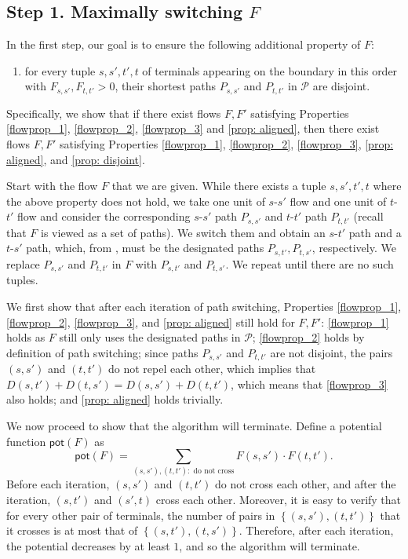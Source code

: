 \documentclass[11pt]{article}
\newcommand{\pset}{{\mathcal{P}}}
\newcommand{\pot}{{\mathsf{pot}}}
\newcommand{\set}[1]{\left\{ #1 \right\}}
\begin{document}
\subsection{Step 1. Maximally switching $F$}

In the first step, our goal is to ensure the following additional property of $F$:
\begin{enumerate}[resume]
\item for every tuple $s,s',t',t$ of terminals appearing on the boundary in this order with $F_{s,s'},F_{t,t'}>0$, their shortest paths $P_{s,s'}$ and $P_{t,t'}$ in $\pset$ are disjoint.  \label{prop: disjoint}
\end{enumerate}

Specifically, we show that if there exist flows $F,F'$ satisfying Properties \ref{flowprop_1}, \ref{flowprop_2}, \ref{flowprop_3} and \ref{prop: aligned}, then there exist flows $F,F'$ satisfying Properties \ref{flowprop_1}, \ref{flowprop_2}, \ref{flowprop_3}, \ref{prop: aligned}, and \ref{prop: disjoint}.

Start with the flow $F$ that we are given. While there exists a tuple $s,s',t',t$ where the above property does not hold, 
we take one unit of $s$-$s'$ flow and one unit of $t$-$t'$ flow and consider the corresponding $s$-$s'$ path $P_{s,s'}$ and $t$-$t'$ path $P_{t,t'}$ (recall that $F$ is viewed as a set of paths). We switch them and obtain an $s$-$t'$ path and a $t$-$s'$ path, which,
from , must be the designated paths $P_{s,t'},P_{t,s'}$, respectively. We replace $P_{s,s'}$ and $P_{t,t'}$ in $F$ with $P_{s,t'}$ and $P_{t,s'}$. We repeat until there are no such tuples.

We first show that after each iteration of path switching, Properties \ref{flowprop_1}, \ref{flowprop_2}, \ref{flowprop_3}, and \ref{prop: aligned} still hold for $F,F'$: \ref{flowprop_1} holds as $F$ still only uses the designated paths in $\pset$; \ref{flowprop_2} holds by definition of path switching; since paths $P_{s,s'}$ and $P_{t,t'}$ are not disjoint, the pairs $(s,s')$ and $(t,t')$ do not repel each other, which implies that $D(s,t')+D(t,s')=D(s,s')+D(t,t')$, which means that \ref{flowprop_3} also holds; and \ref{prop: aligned} holds trivially. 

We now proceed to show that the algorithm will terminate. Define a potential function $\pot(F)$ as
\[
\pot(F) =   \sum_{(s,s'), (t,t'): \text{ do not cross}} F(s,s') \cdot F(t,t').
\]
Before each iteration, $(s,s')$ and $(t,t')$ do not cross each other, and after the iteration, $(s,t')$ and $(s',t)$ cross each other. 
Moreover, it is easy to verify that for every other pair of terminals, the number of pairs in $\set{(s,s'),(t,t')}$ that it crosses is at most that of $\set{(s,t'),(t,s')}$. Therefore, after each iteration, the potential decreases by at least $1$, and so the algorithm will terminate.
\end{document}
